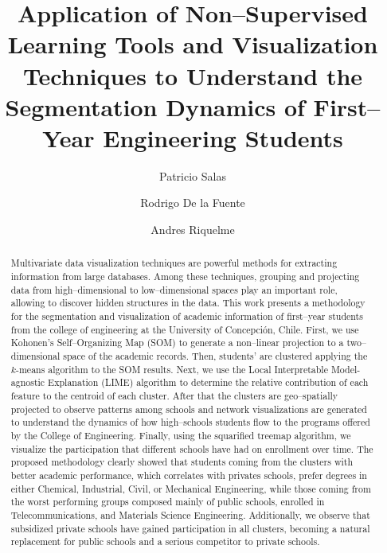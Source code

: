 \documentclass[5p,authoryear,preprint,12pt]{elsarticle}
\begin{document}
\begin{frontmatter}
	
\title{Application of Non--Supervised Learning Tools and Visualization Techniques to Understand the Segmentation Dynamics of First--Year Engineering Students
}
  
\author[a]{Patricio Salas}
\author[a]{Rodrigo De la Fuente}
\author[b]{Andres Riquelme}
\address[a]{Department of Industrial Engineering\unskip, 
	Universidad de Concepci\'{o}n\unskip, Concepci\'{o}n\unskip, Chile}
\address[b]{Facultad de Econom\'{\i}a y Negocios\unskip, 
  Universidad de Talca}
 

\begin{abstract}
 Multivariate data visualization techniques are powerful methods for extracting information from large databases. Among these techniques, grouping and projecting data from high--dimensional to low--dimensional spaces play an important role, allowing to discover hidden structures in the data. This work presents a methodology for the segmentation and visualization of academic information of first--year students from the college of engineering at the University of Concepci\'on, Chile. First, we use Kohonen's Self--Organizing Map (SOM) to generate a non--linear projection to a two--dimensional space of the academic records. Then, students' are clustered applying the $k$-means algorithm to the SOM results. Next, we use the Local Interpretable Model-agnostic Explanation (LIME) algorithm to determine the relative contribution of each feature to the centroid of each cluster. After that the clusters are geo--spatially projected to observe patterns among schools and network visualizations are generated to understand the dynamics of how high--schools students flow to the programs offered by the College of Engineering. Finally, using the squarified treemap algorithm, we visualize the participation that different schools have had on enrollment over time. The proposed methodology clearly showed that students coming from the clusters with better academic performance, which correlates with privates schools, prefer degrees in either Chemical, Industrial, Civil, or Mechanical Engineering, while those coming from the worst performing groups composed mainly of public schools, enrolled in Telecommunications, and Materials Science Engineering. Additionally, we observe that subsidized private schools have gained participation in all clusters, becoming a natural replacement for public schools and a serious competitor to private schools.
\end{abstract}
\end{frontmatter}
  
\end{document}
